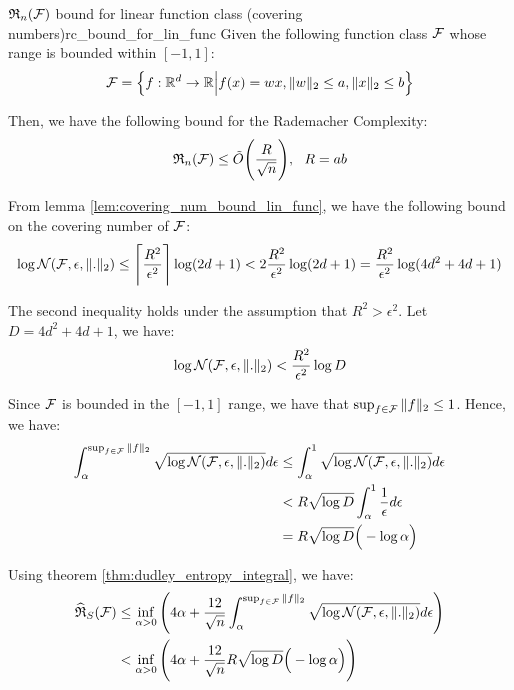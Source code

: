 \begin{proposition}{$\mathfrak{R}_n(\mathcal{F})$ bound for linear function class (covering numbers)}{rc_bound_for_lin_func}
    Given the following function class $\mathcal{F}$ whose range is bounded within $[-1, 1]$:
    \begin{align*}
        \mathcal{F} = \Big\{ 
            f:\mathbb{R}^d\to\mathbb{R} \Big| f(x) = wx, \|w\|_2 \le a, \|x\|_2 \le b
         \Big\}
    \end{align*}

    \noindent Then, we have the following bound for the Rademacher Complexity:
    \begin{align*}
        \mathfrak{R}_n(\mathcal{F}) \le \tilde O \Bigg( \frac{R}{\sqrt{n}} \Bigg), \ \ R = ab
    \end{align*}
\end{proposition}

\begin{proof*}
    \noindent From lemma \ref{lem:covering_num_bound_lin_func}, we have the following bound on the covering number of $\mathcal{F}$:
    \begin{align*}
        \log\mathcal{N}(\mathcal{F}, \epsilon, \|.\|_2) \le \Bigg\lceil \frac{R^2}{\epsilon^2} \Bigg\rceil \log(2d+1) < 2\frac{R^2}{\epsilon^2}\log(2d+1) = \frac{R^2}{\epsilon^2}\log(4d^2 + 4d + 1)
    \end{align*}

    \noindent The second inequality holds under the assumption that $R^2 > \epsilon^2$. Let $D = 4d^2 + 4d + 1$, we have:
    \begin{align*}
        \log\mathcal{N}(\mathcal{F}, \epsilon, \|.\|_2) < \frac{R^2}{\epsilon^2} \log D
    \end{align*}

    \noindent Since $\mathcal{F}$ is bounded in the $[-1, 1]$ range, we have that $\sup_{f\in\mathcal{F}}\|f\|_2 \le 1$. Hence, we have:
    \begin{align*}
        \int_\alpha^{\sup_{f\in\mathcal{F}}\|f\|_2} \sqrt{\log\mathcal{N}(\mathcal{F}, \epsilon, \|.\|_2)} d\epsilon
            &\le \int_\alpha^1 \sqrt{\log\mathcal{N}(\mathcal{F}, \epsilon, \|.\|_2)} d\epsilon \\
            &< R\sqrt{\log D}\int_\alpha^1 \frac{1}{\epsilon}d\epsilon \\
            &= R\sqrt{\log D}\Big(  - \log\alpha  \Big)
    \end{align*}

    \noindent Using theorem \ref{thm:dudley_entropy_integral}, we have:
    \begin{align*}
        \widehat{\mathfrak{R}}_S(\mathcal{F}) 
            &\le \inf_{\alpha>0}\Bigg( 
                4\alpha + \frac{12}{\sqrt n} \int_\alpha^{\sup_{f\in\mathcal{F}}\|f\|_2} \sqrt{\log\mathcal{N}(\mathcal{F}, \epsilon, \|.\|_2)} d\epsilon
             \Bigg) \\
            &< \inf_{\alpha>0}\Bigg( 
                4\alpha + \frac{12}{\sqrt n} R\sqrt{\log D} \Big(  - \log\alpha  \Big)
             \Bigg)
    \end{align*}


\end{proof*}
